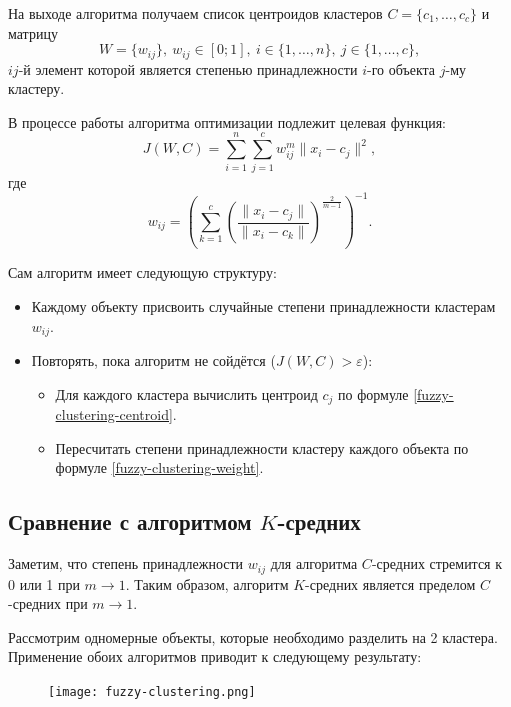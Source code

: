 На выходе алгоритма получаем список центроидов кластеров $C = \{c_1, \ldots, c_c\}$ и матрицу
\begin{equation*}
    W = \{w_{ij}\},\ w_{ij} \in [0; 1],\ i \in \{1, \ldots, n\},\ j \in \{1, \ldots, c\},
\end{equation*}
$ij$-й элемент которой является степенью принадлежности $i$-го объекта $j$-му кластеру.

В процессе работы алгоритма оптимизации подлежит целевая функция:
\begin{equation*}
    J(W, C) = \sum\limits_{i = 1}^{n} \sum\limits_{j = 1}^{c} w_{ij}^{m} \lVert x_i - c_j \rVert^2,
\end{equation*}
где
\begin{equation}\label{fuzzy-clustering-weight}
    w_{ij} = \left(\sum\limits_{k = 1}^{c}
        \left(
            \frac{\lVert x_i - c_j \rVert}{\lVert x_i - c_k \rVert}
        \right)^{\frac{2}{m - 1}}
    \right)^{-1}.
\end{equation}

Сам алгоритм имеет следующую структуру:

\begin{itemize}
    \item Каждому объекту присвоить случайные степени принадлежности кластерам $w_{ij}$.
    \item Повторять, пока алгоритм не сойдётся ($J(W, C) > \varepsilon$):
    \begin{itemize}
        \item Для каждого кластера вычислить центроид $c_j$ по формуле
                \eqref{fuzzy-clustering-centroid}.
        \item Пересчитать степени принадлежности кластеру каждого объекта по формуле
                \eqref{fuzzy-clustering-weight}.
    \end{itemize}
\end{itemize}

\subsection{Сравнение с алгоритмом $K$-средних}

Заметим, что степень принадлежности $w_{ij}$ для алгоритма $C$-средних стремится к 0 или 1 при
$m \to 1$. Таким образом, алгоритм $K$-средних является пределом $C$-средних при $m \to 1$.

Рассмотрим одномерные объекты, которые необходимо разделить на 2 кластера. Применение обоих
алгоритмов приводит к следующему результату:
\begin{figure}[H]
    \centering
    \texttt{[image: fuzzy-clustering.png]}
\end{figure}

